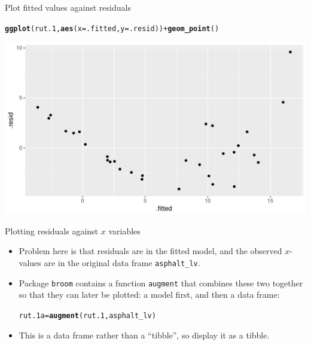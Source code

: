 \documentclass[unknownkeysallowed]{beamer}\usepackage[]{graphicx}\usepackage[]{color}
\makeatletter
\def\maxwidth{ %
  \ifdim\Gin@nat@width>\linewidth
    \linewidth
  \else
    \Gin@nat@width
  \fi
}
\newcommand{\hlopt}[1]{\textcolor[rgb]{0,0,0}{#1}}%
\newcommand{\hlstd}[1]{\textcolor[rgb]{0.345,0.345,0.345}{#1}}%
\newcommand{\hlkwb}[1]{\textcolor[rgb]{0.69,0.353,0.396}{#1}}%
\newcommand{\hlkwc}[1]{\textcolor[rgb]{0.333,0.667,0.333}{#1}}%
\newcommand{\hlkwd}[1]{\textcolor[rgb]{0.737,0.353,0.396}{\textbf{#1}}}%
\newenvironment{kframe}{%
 \def\at@end@of@kframe{}%
 \ifinner\ifhmode%
  \def\at@end@of@kframe{\end{minipage}}%
  \begin{minipage}{\columnwidth}%
 \fi\fi%
 \def\FrameCommand##1{\hskip\@totalleftmargin \hskip-\fboxsep
 \colorbox{shadecolor}{##1}\hskip-\fboxsep
     \hskip-\linewidth \hskip-\@totalleftmargin \hskip\columnwidth}%
 \MakeFramed {\advance\hsize-\width
   \@totalleftmargin\z@ \linewidth\hsize
   \@setminipage}}%
 {\par\unskip\endMakeFramed%
 \at@end@of@kframe}
\newenvironment{knitrout}{}{} %
\makeatother
\begin{document}
\begin{frame}[fragile]{Plot fitted values against residuals}
  
\begin{knitrout}
\color{fgcolor}\begin{kframe}
\begin{alltt}
\hlkwd{ggplot}\hlstd{(rut.1,}\hlkwd{aes}\hlstd{(}\hlkwc{x}\hlstd{=.fitted,}\hlkwc{y}\hlstd{=.resid))}\hlopt{+}\hlkwd{geom_point}\hlstd{()}
\end{alltt}
\end{kframe}
\includegraphics[width=\maxwidth]{figure/unnamed-chunk-270-1} 

\end{knitrout}
  
\end{frame}

\begin{frame}[fragile]{Plotting residuals against $x$ variables}
  
  \begin{itemize}
  \item Problem here is that residuals are in the fitted model, and
    the observed $x$-values are in the original data frame
    \texttt{asphalt\_lv}. 
  \item Package \texttt{broom} contains a function \texttt{augment}
    that combines these two together so that they can later be
    plotted: a model first, and then a data frame:
    
\begin{knitrout}
\color{fgcolor}\begin{kframe}
\begin{alltt}
\hlstd{rut.1a}\hlkwb{=}\hlkwd{augment}\hlstd{(rut.1,asphalt_lv)}
\end{alltt}
\end{kframe}
\end{knitrout}
\item This is a data frame rather than a ``tibble'', so display it as
  a tibble.
  \end{itemize}
  
\end{frame}
\end{document}
